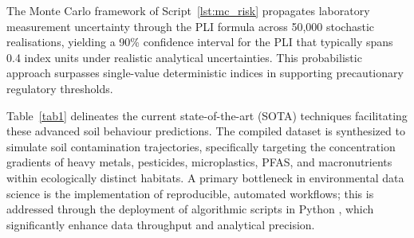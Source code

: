 \documentclass[environments,article,submit,pdftex,moreauthors]{Definitions/mdpi}
\begin{document}
The Monte Carlo framework of Script~\ref{lst:mc_risk} propagates laboratory
measurement uncertainty through the PLI formula across 50,000 stochastic
realisations, yielding a 90\% confidence interval for the PLI that typically
spans 0.4 index units under realistic analytical uncertainties. This
probabilistic approach surpasses single-value deterministic indices in
supporting precautionary regulatory thresholds.

Table~\ref{tab1} delineates the current state-of-the-art (SOTA) techniques
facilitating these advanced soil behaviour predictions. The compiled dataset is synthesized to simulate soil contamination
trajectories, specifically targeting the concentration gradients of heavy
metals, pesticides, microplastics, PFAS, and macronutrients within
ecologically distinct habitats. A primary bottleneck in environmental data
science is the implementation of reproducible, automated workflows; this is
addressed through the deployment of algorithmic scripts in Python
\cite{Olah2025,Lemenkova2022,Wang2024b}, which significantly enhance data
throughput and analytical precision.
\end{document}

